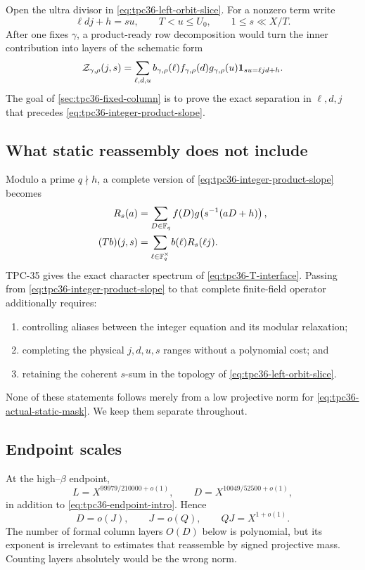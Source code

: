 Open the ultra divisor in \eqref{eq:tpc36-left-orbit-slice}.  For a
nonzero term write
\begin{equation}
 \ell dj+h=su,
 \qquad
 T<u\le U_0,\qquad
 1\le s\ll X/T.
 \label{eq:tpc36-reflection}
\end{equation}
After one fixes \(\gamma\), a product-ready row decomposition would turn
the inner contribution into layers of the schematic form
\begin{equation}
 \mathcal Z_{\gamma,\rho}(j,s)
 =\sum_{\ell,d,u}
 b_{\gamma,\rho}(\ell)f_{\gamma,\rho}(d)
 g_{\gamma,\rho}(u)
 \mathbf 1_{su=\ell jd+h}.
 \label{eq:tpc36-integer-product-slope}
\end{equation}
The goal of \cref{sec:tpc36-fixed-column} is to prove the exact
separation in \(\ell,d,j\) that precedes
\eqref{eq:tpc36-integer-product-slope}.

\subsection{What static reassembly does not include}

Modulo a prime \(q\nmid h\), a complete version of
\eqref{eq:tpc36-integer-product-slope} becomes
\begin{align}
 R_s(a)&=\sum_{D\in\mathbb F_q}f(D)
 g\!\left(s^{-1}(aD+h)\right),
 \label{eq:tpc36-Rsa-interface}\\
 (Tb)(j,s)&=\sum_{\ell\in\mathbb F_q^\times}b(\ell)R_s(\ell j).
 \label{eq:tpc36-T-interface}
\end{align}
TPC-35 gives the exact character spectrum of
\eqref{eq:tpc36-T-interface}.  Passing from
\eqref{eq:tpc36-integer-product-slope} to that complete finite-field
operator additionally requires:
\begin{enumerate}[label=(\roman*)]
 \item controlling aliases between the integer equation and its modular
 relaxation;
 \item completing the physical \(j,d,u,s\) ranges without a polynomial
 cost; and
 \item retaining the coherent \(s\)-sum in the topology of
 \eqref{eq:tpc36-left-orbit-slice}.
\end{enumerate}
None of these statements follows merely from a low projective norm for
\eqref{eq:tpc36-actual-static-mask}.  We keep them separate throughout.

\subsection{Endpoint scales}

At the high--\(\beta\) endpoint,
\begin{equation}
 L=X^{99979/210000+o(1)},\qquad
 D=X^{10049/52500+o(1)},
 \label{eq:tpc36-LD-endpoint}
\end{equation}
in addition to \eqref{eq:tpc36-endpoint-intro}.  Hence
\begin{equation}
 D=o(J),\qquad J=o(Q),\qquad QJ=X^{1+o(1)}.
 \label{eq:tpc36-endpoint-relations}
\end{equation}
The number of formal column layers \(O(D)\) below is polynomial, but its
exponent is irrelevant to estimates that reassemble by signed projective
mass.  Counting layers absolutely would be the wrong norm.
